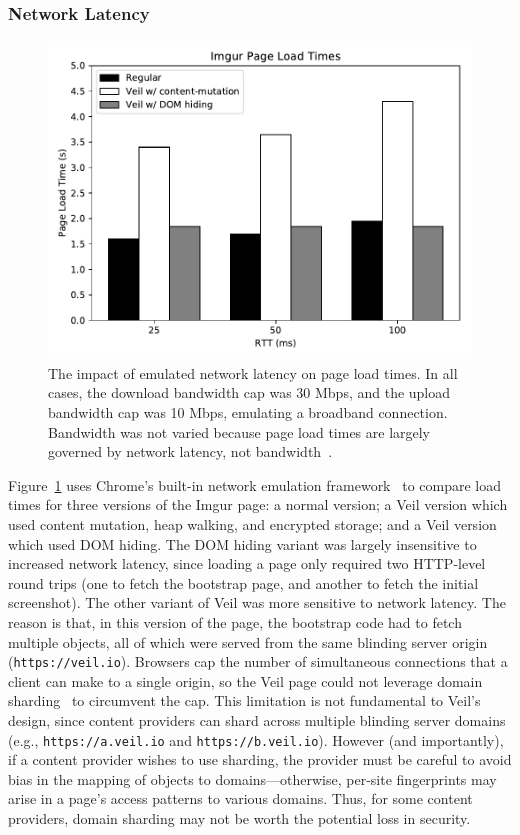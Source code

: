 \subsubsection{Network Latency}
\label{sec:lat}

\begin{figure}
	\centering
	\includegraphics[width=\textwidth]{veil-figs/network_em.pdf}
	\caption[The impact of emulated network latency on page load
	times.]{The impact of emulated network latency on page load
		times. In all cases, the download bandwidth cap
		was 30 Mbps, and the upload bandwidth cap was 10
		Mbps, emulating a broadband connection. Bandwidth
		was not varied because page load times are largely
		governed by network latency, not bandwidth~\cite{gentleaggression}.}
	\label{fig:net_em}
\end{figure}

Figure~\ref{fig:net_em} uses Chrome's built-in network
emulation framework~\cite{chromeThrottle} to compare load times
for three versions of the Imgur page: a normal version;
a Veil version which used content mutation, heap
walking, and encrypted storage; and a Veil version
which used DOM hiding. The DOM hiding variant was largely
insensitive to increased network latency, since loading
a page only required two HTTP-level round trips (one to
fetch the bootstrap page, and another to fetch the initial
screenshot). The other variant of Veil was more sensitive
to network latency. The reason is that, in this version of
the page, the bootstrap code had to fetch multiple objects,
all of which were served from the same blinding server origin
(\texttt{https://veil.io}). Browsers cap the number
of simultaneous connections that a client can make to
a single origin, so the Veil page could not leverage
domain sharding~\cite{domainSharding} to circumvent the
cap. This limitation is not fundamental to Veil's design,
since content providers can shard across multiple blinding
server domains (e.g., \texttt{https://a.veil.io}
and \texttt{https://b.veil.io}). However (and
importantly), if a content provider wishes to use
sharding, the provider must be careful to avoid bias
in the mapping of objects to domains---otherwise,
per-site fingerprints may arise in a page's access
patterns to various domains. Thus, for some content
providers, domain sharding may not be worth the potential
loss in security.

